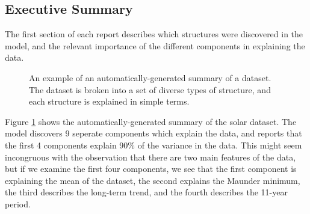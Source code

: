 \documentclass{article} %
\begin{document}
\subsection{Executive Summary}

The first section of each report describes which structures were discovered in the model, and the relevant importance of the different components in explaining the data.

\begin{figure}[h]
\centering
{}
\caption{
An example of an automatically-generated summary of a dataset.  The dataset is broken into a set of diverse types of structure, and each structure is explained in simple terms.}
\label{fig:exec}
\end{figure}


Figure \ref{fig:exec} shows the automatically-generated summary of the solar dataset.  The model discovers 9 seperate components which explain the data, and reports that the first 4 components explain 90\% of the variance in the data.  This might seem incongruous with the observation that there are two main features of the data, but if we examine the first four components, we see that the first component is explaining the mean of the dataset, the second explains the Maunder minimum, the third describes the long-term trend, and the fourth describes the 11-year period.
\end{document}
